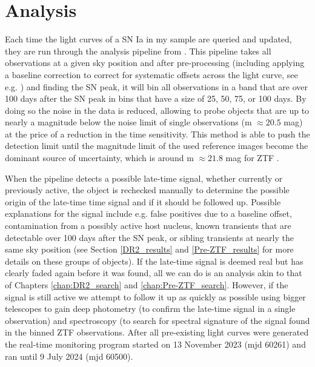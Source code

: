 \documentclass[a4paper,oneside,12pt, class=Latex/Classes/PhDthesisPSnPDF, crop=false]{standalone}
\begin{document}
\section{Analysis}
\label{analysis}
Each time the light curves of a SN Ia in my sample are queried and updated, they are run through the analysis pipeline from \citet{Terwel_2024_paper1}. This pipeline takes all observations at a given sky position and after pre-processing (including applying a baseline correction to correct for systematic offsets across the light curve, see e.g. \citealt{Yao_baseline_corr,Miller_baseline_corr}) and finding the SN peak, it will bin all observations in a band that are over 100 days after the SN peak in bins that have a size of 25, 50, 75, or 100 days. By doing so the noise in the data is reduced, allowing to probe objects that are up to nearly a magnitude below the noise limit of single observations (m $\approx20.5$ mag) at the price of a reduction in the time sensitivity. This method is able to push the detection limit until the magnitude limit of the used reference images become the dominant source of uncertainty, which is around m $\approx21.8$ mag for ZTF \citep{ref_uncert}.

When the pipeline detects a possible late-time signal, whether currently or previously active, the object is rechecked manually to determine the possible origin of the late-time time signal and if it should be followed up. Possible explanations for the signal include e.g. false positives due to a baseline offset, contamination from a possibly active host nucleus, known transients that are detectable over 100 days after the SN peak, or sibling transients at nearly the same sky position (see Section \ref{DR2_results} and \ref{Pre-ZTF_results} for more details on these groups of objects). If the late-time signal is deemed real but has clearly faded again before it was found, all we can do is an analysis akin to that of Chapters \ref{chap:DR2_search} and \ref{chap:Pre-ZTF_search}. However, if the signal is still active we attempt to follow it up as quickly as possible using bigger telescopes to gain deep photometry (to confirm the late-time signal in a single observation) and spectroscopy (to search for spectral signature of the signal found in the binned ZTF observations. After all pre-existing light curves were generated the real-time monitoring program started on 13 November 2023 (mjd 60261) and ran until 9 July 2024 (mjd 60500).
\end{document}
